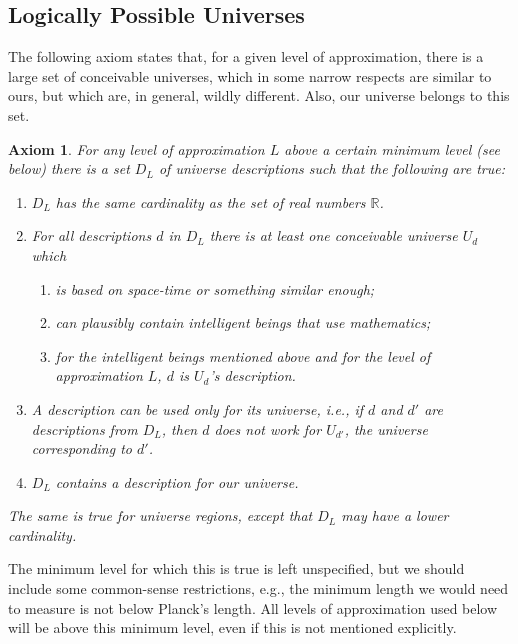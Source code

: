 \documentclass[a4paper
,draft
]{article}
\def\reale{\mathbb{R}}
\def\descriptions{D_L}
\newtheorem{axiom}{Axiom}
\begin{document}
\subsection{Logically Possible Universes}

The following axiom states that, for a given level of approximation,
there is a large set of conceivable universes, which in some narrow respects
are similar to ours, but which are, in general, wildly different.
Also, our universe belongs to this set.

\begin{axiom}\label{ax:uncountable}
  For any level of approximation $L$ above a certain minimum level (see below)
  there is a set $\descriptions$
  of universe descriptions such that the following are true:
  \begin{enumerate}
    \item $\descriptions$ has the same cardinality as
          the set of real numbers $\reale$.
    \item For all descriptions $d$ in $\descriptions$
          there is at least one conceivable
          universe $U_d$ which
      \begin{enumerate}
        \item is based on space-time or something similar enough;
        \item can plausibly contain intelligent beings that use mathematics;
        \item for the intelligent beings mentioned above and
              for the level of approximation $L$,
              $d$ is $U_d$'s description.
      \end{enumerate}
    \item A description can be used only for its universe, i.e.,
          if $d$ and $d'$ are descriptions from $\descriptions$,
          then $d$ does not work
          for $U_{d'}$, the universe corresponding to $d'$.
    \item $\descriptions$ contains a description for our universe.
  \end{enumerate}
  The same is true for universe regions, except that
  $\descriptions$ may have a lower
  cardinality.
\end{axiom}

The minimum level for which this is true is left unspecified, but we should
include some common-sense restrictions, e.g., the minimum length we would
need to measure is not below Planck's length.
All levels of approximation used below will be above this
minimum level, even if this is not mentioned explicitly.
\end{document}
